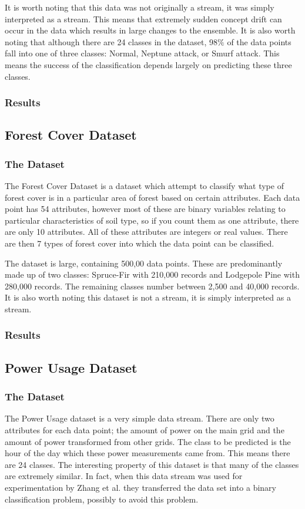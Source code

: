 \documentclass[12pt,a4paper,oneside]{report}
\begin{document}
It is worth noting that this data was not originally a stream, it was simply interpreted as a stream. This means that extremely sudden concept drift can occur in the data which results in large changes to the ensemble. It is also worth noting that although there are 24 classes in the dataset, 98\(\%\) of the data points fall into one of three classes: Normal, Neptune attack, or Smurf attack. This means the success of the classification depends largely on predicting these three classes. 
\subsubsection{Results}

\subsection{Forest Cover Dataset}
\subsubsection{The Dataset}

The Forest Cover Dataset is a dataset which attempt to classify what type of forest cover is in a particular area of forest based on certain attributes. Each data point has 54 attributes, however most of these are binary variables relating to particular characteristics of soil type, so if you count them as one attribute, there are only 10 attributes. All of these attributes are integers or real values.  There are then 7 types of forest cover into which the data point can be classified. 

The dataset is large, containing 500,00 data points. These are predominantly made up of two classes: Spruce-Fir with 210,000 records and Lodgepole Pine with 280,000 records. The remaining classes number between 2,500 and 40,000 records. It is also worth noting this dataset is not a stream, it is simply interpreted as a stream. 


\subsubsection{Results}

\subsection{Power Usage Dataset}
\subsubsection{The Dataset}
The Power Usage dataset is a very simple data stream. There are only two attributes for each data point; the amount of power on the main grid and the amount of power transformed from other grids. The class to be predicted is the hour of the day which these power measurements came from. This means there are 24 classes. The interesting property of this dataset is that many of the classes are extremely similar. In fact, when this data stream was used for experimentation by Zhang et al.\cite{Zhang} they transferred the data set into a binary classification problem, possibly to avoid this problem. 
\end{document}
